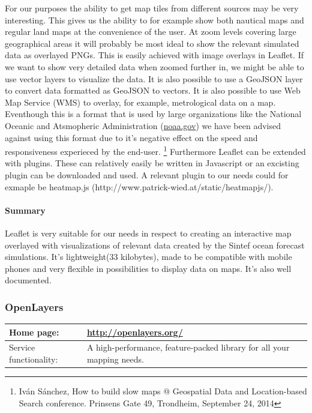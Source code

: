 \documentclass[11pt,a4paper,titlepage,oneside]{report}
\begin{document}
  For our purposes the ability to get map tiles from different sources may be very interesting. This gives us the ability to for example show both nautical maps and regular land maps at the convenience of the user. At zoom levels covering large geographical areas it will probably be most ideal to show the relevant simulated data as overlayed PNGs. This is easily achieved with image overlays in Leaflet. If we want to show very detailed data when zoomed further in, we might be able to use vector layers to visualize the data. It is also possible to use a GeoJSON layer to convert data formatted as GeoJSON to vectors.
  It is also possible to use Web Map Service (WMS) to overlay, for example, metrological data on a map. Eventhough this is a format that is used by large organizations like the National Oceanic and Atsmopheric Administration (\url{noaa.gov}) we have been advised against using this format due to it's negative effect on the speed and responsiveness experieced by the end-user. \footnote{Iván Sánchez, How to build slow maps @ Geospatial Data and Location-based Search conference. Prinsens Gate 49, Trondheim, September 24, 2014}
  Furthermore Leaflet can be extended with plugins. These can relatively easily be written in Javascript or an excisting plugin can be downloaded and used. A relevant plugin to our needs could for exmaple be heatmap.js (http://www.patrick-wied.at/static/heatmapjs/).

  \paragraph{Summary}
  Leaflet is very suitable for our needs in respect to creating an interactive map overlayed with visualizations of relevant data created by the Sintef ocean forecast simulations. It's lightweight(33 kilobytes), made to be compatible with mobile phones and very flexible in possibilities to display data on maps. It's also well documented.

  \subsubsection{OpenLayers}
  \begin{tabular}{|p{4cm}|p{8cm}|}
    \hline
    Home page: & \url{http://openlayers.org/} \\
    \hline
    Service functionality: & A high-performance, feature-packed library for all your mapping needs. \\
    \hline
  \end{tabular}
  
\end{document}
